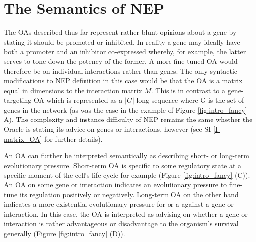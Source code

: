 \documentclass[12pt]{article}
\begin{document}
\section{The Semantics of NEP}\label{sup_semantics}
The OAs described thus far represent rather blunt opinions about a gene by stating it should be promoted or inhibited. In reality a gene may ideally have both a promoter and an inhibitor co-expressed whereby, for example, the latter serves to tone down the potency of the former. A more fine-tuned OA would therefore be on individual interactions rather than genes. The only syntactic modifications to NEP definition in this case would be that the OA is a matrix equal in dimensions to the interaction matrix $M$. This is in contrast to a gene-targeting OA which is represented as a $|G|$-long sequence where G is the set of genes in the network (as was the case in the example of Figure \ref{fig:intro_fancy} A). The complexity and instance difficulty of NEP remains the same whether the Oracle is stating its advice on genes or interactions, however (see SI \ref{I-matrix_OA} for further details).

An OA can further be interpreted semantically as describing short- or long-term evolutionary pressure. Short-term OA is specific to some regulatory state at a specific moment of the cell's life cycle for example (Figure \ref{fig:intro_fancy} (C)). An OA on some gene or interaction indicates an evolutionary pressure to fine-tune its regulation positively or negatively. Long-term OA on the other hand indicates a more existential evolutionary pressure for or a against a gene or interaction. In this case, the OA is interpreted as advising on whether a gene or interaction is rather advantageous or disadvantage to the organism's survival generally (Figure \ref{fig:intro_fancy} (D)).
\end{document}
